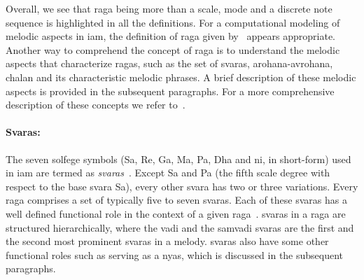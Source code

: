 Overall, we see that \gls{raga} being more than a scale, mode and a discrete note sequence is highlighted in all the definitions. For a computational modeling of melodic aspects in \gls{iam}, the definition of \gls{raga} given by~\cite{chordia2013joint} appears appropriate. Another way to comprehend the concept of \gls{raga} is to understand the melodic aspects that characterize \glspl{raga}, such as the set of \glspl{svara}, \gls{arohana}-\gls{avrohana}, \gls{chalan} and its characteristic melodic phrases. A brief description of these melodic aspects is provided in the subsequent paragraphs. For a more comprehensive description of these concepts we refer to~\cite{Danielou2010,Bagchee1998,Viswanathan2004}.


\paragraph{Svaras:} The seven solfege symbols (Sa, Re, Ga, Ma, Pa, Dha and \acrshort{ni}, in short-form) used in \gls{iam} are termed as \textit{svaras}~\citep{Danielou2010,Bagchee1998}. Except Sa and Pa (the fifth scale degree with respect to the base \gls{svara} Sa), every other \gls{svara} has two or three variations. Every \gls{raga} comprises a set of typically five to seven \glspl{svara}. Each of these \glspl{svara} has a well defined functional role in the context of a given \gls{raga}~\citep{Viswanathan2004}. \Glspl{svara} in a \gls{raga} are structured hierarchically, where the \gls{vadi} and the \gls{samvadi} \glspl{svara} are the first and the second most prominent \glspl{svara} in a melody. \Glspl{svara} also have some other functional roles such as serving as a \gls{nyas}, which is discussed in the subsequent paragraphs. 

